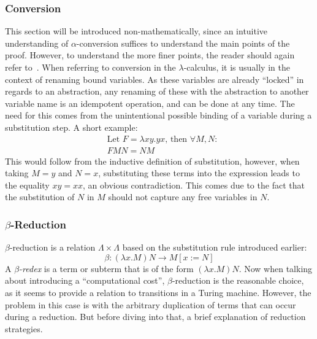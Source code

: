\message{ !name(VU-CS-BSc-thesis-template.tex)}\documentclass[11pt]{article}
\begin{document}
\subsubsection{Conversion}
This section will be introduced non-mathematically, since an intuitive understanding of $\alpha$-conversion suffices to understand the main points of the proof. However, to understand the more finer points, the reader should again refer to~\cite{barendregt1984lambda}.
When referring to conversion in the $\lambda$-calculus, it is usually in the context of renaming bound variables. As these variables are already \enquote{locked} in regards to an abstraction, any renaming of these with the abstraction to another variable name is an idempotent operation, and can be done at any time.
The need for this comes from the unintentional possible binding of a variable during a substitution step. A short example:
\begin{equation}
  \begin{split}
    & \text{Let } F = \lambda xy.yx \text{, then } \forall M, N: \\
    & FMN = NM
  \end{split}
\end{equation}
This would follow from the inductive definition of substitution, however, when taking $M = y$ and $N = x$, substituting these terms into the expression leads to the equality $xy = xx$, an obvious contradiction.
This comes due to the fact that the substitution of $N$ in $M$ should not capture any free variables in $N$.
\subsubsection{$\beta$-Reduction}\label{reduction}
$\beta$-reduction is a relation $\Lambda \times \Lambda$ based on the substitution rule introduced earlier:
\begin{equation}
  \beta : ( \lambda x.M ) N \rightarrow M [ x:=N ]
\end{equation}
A \textit{$\beta$-redex} is a term or subterm that is of the form $(\lambda x . M)N$.
Now when talking about introducing a \enquote{computational cost}, $\beta$-reduction is the reasonable choice, as it seems to provide a relation to transitions in a Turing machine. However, the problem in this case is with the arbitrary duplication of terms that can occur during a reduction.
But before diving into that, a brief explanation of reduction strategies.
\end{document}
